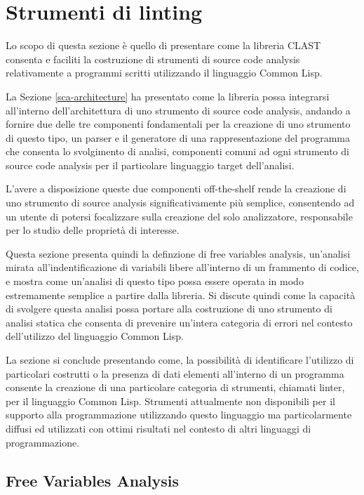 \section{Strumenti di linting}
\label{lint}

Lo scopo di questa sezione è quello di presentare come la libreria CLAST
consenta e faciliti la costruzione di strumenti di source code analysis
relativamente a programmi scritti utilizzando il linguaggio Common Lisp.

La Sezione \ref{sca-architecture} ha presentato come la libreria possa
integrarsi all'interno dell'architettura di uno strumento di source code
analysis, andando a fornire due delle tre componenti fondamentali per la
creazione di uno strumento di questo tipo, un parser e il generatore di una
rappresentazione del programma che consenta lo svolgimento di analisi,
componenti comuni ad ogni strumento di source code analysis per il particolare
linguaggio target dell'analisi.

L'avere a disposizione queste due componenti off-the-shelf rende la creazione di
uno strumento di source analysis significativamente più semplice, consentendo ad
un utente di potersi focalizzare sulla creazione del solo analizzatore,
responsabile per lo studio delle proprietà di interesse.

Questa sezione presenta quindi la definzione di free variables analysis,
un'analisi mirata all'indentificazione di variabili libere all'interno di un
frammento di codice, e mostra come un'analisi di questo tipo possa essere
operata in modo estremamente semplice a partire dalla libreria. Si discute
quindi come la capacità di svolgere questa analisi possa portare alla
costruzione di uno strumento di analisi statica che consenta di prevenire
un'intera categoria di errori nel contesto dell'utilizzo del linguaggio Common
Lisp.

La sezione si conclude presentando come, la possibilità di identificare
l'utilizzo di particolari costrutti o la presenza di dati elementi all'interno
di un programma consente la creazione di una particolare categoria di strumenti,
chiamati linter, per il linguaggio Common Lisp. Strumenti attualmente non
disponibili per il supporto alla programmazione utilizzando questo linguaggio ma
particolarmente diffusi ed utilizzati con ottimi risultati nel contesto di altri
linguaggi di programmazione. \cite{DBLP:conf/sac/PotocnikCS14}

\subsection{Free Variables Analysis}
\label{free-variables-analysis}

